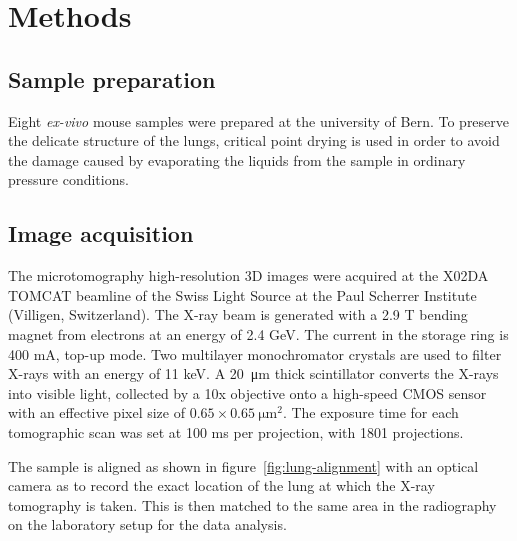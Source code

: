 \section{Methods}\label{sec:methods}
\subsection{Sample preparation}
Eight \emph{ex-vivo} mouse samples were prepared at the university of Bern.
To preserve the delicate structure of the lungs, critical point
drying is used in order to avoid the damage caused by evaporating the liquids
from the sample in ordinary pressure conditions.

\subsection{Image acquisition}\label{sec:acquisition}
The microtomography high-resolution 3D images were acquired at the X02DA
TOMCAT beamline of the Swiss Light Source at the Paul Scherrer Institute
(Villigen, Switzerland). The X-ray beam is generated with a 2.9 T bending
magnet from electrons at an energy of 2.4 GeV. The current in the storage
ring is 400 mA, top-up mode. Two multilayer monochromator crystals are used
to filter X-rays with an energy of 11 keV. A \SI{20}{\micro\meter} thick scintillator
converts the X-rays into visible light, collected by a 10x objective onto a
high-speed CMOS sensor with an effective pixel size of $0.65 \times
\SI{0.65}{\micro\meter\squared}$. The exposure time for each tomographic
scan was set at 100 ms per projection, with 1801 projections.

The sample is aligned as shown in figure~\ref{fig:lung-alignment} with an
optical camera as to record the exact location of the lung at which the X-ray
tomography is taken. This is then matched to the same area in the
radiography on the laboratory setup for the data analysis.


